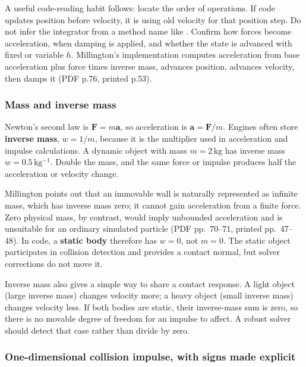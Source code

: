 A useful code-reading habit follows: locate the order of operations. If code updates position before velocity, it is using old velocity for that position step. Do not infer the integrator from a method name like . Confirm how forces become acceleration, when damping is applied, and whether the state is advanced with fixed or variable \(h\). Millington's implementation computes acceleration from base acceleration plus force times inverse mass, advances position, advances velocity, then damps it (PDF p.76, printed p.53).

\subsubsection{Mass and inverse mass}\label{06-engine-ii-ch033-mass-and-inverse-mass}

\hypertarget{06-engine-ii-ch033-mass-and-inverse-mass}{}

Newton's second law is \(\mathbf{F}=m\mathbf{a}\), so acceleration is \(\mathbf{a}=\mathbf{F}/m\). Engines often store \textbf{inverse mass}, \(w=1/m\), because it is the multiplier used in acceleration and impulse calculations. A dynamic object with mass \(m=2\,\mathrm{kg}\) has inverse mass \(w=0.5\,\mathrm{kg^{-1}}\). Double the mass, and the same force or impulse produces half the acceleration or velocity change.

Millington points out that an immovable wall is naturally represented as infinite mass, which has inverse mass zero; it cannot gain acceleration from a finite force. Zero physical mass, by contrast, would imply unbounded acceleration and is unsuitable for an ordinary simulated particle (PDF pp.~70--71, printed pp.~47--48). In code, a \textbf{static body} therefore has \(w=0\), not \(m=0\). The static object participates in collision detection and provides a contact normal, but solver corrections do not move it.

Inverse mass also gives a simple way to share a contact response. A light object (large inverse mass) changes velocity more; a heavy object (small inverse mass) changes velocity less. If both bodies are static, their inverse-mass sum is zero, so there is no movable degree of freedom for an impulse to affect. A robust solver should detect that case rather than divide by zero.

\subsubsection{One-dimensional collision impulse, with signs made explicit}\label{06-engine-ii-ch033-one-dimensional-collision-impulse-with-signs-made-explicit}

